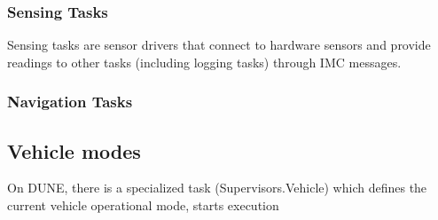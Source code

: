 \documentclass{article}
\begin{document}
\subsubsection{Sensing Tasks}
Sensing tasks are sensor drivers that connect to hardware sensors and provide
readings to other tasks (including logging tasks) through IMC messages.

\subsubsection{Navigation Tasks}

\subsection{Vehicle modes}
On DUNE, there is a specialized task (Supervisors.Vehicle) which defines the
current vehicle operational mode, starts execution
\end{document}

